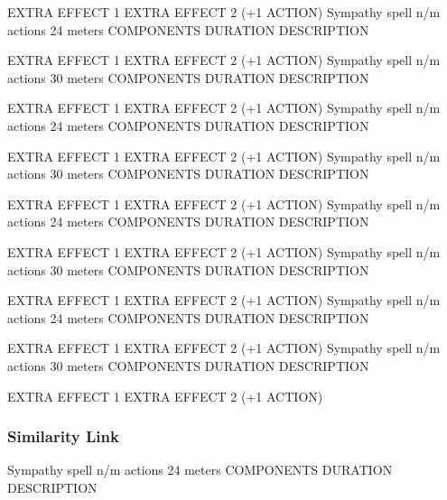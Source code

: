        EXTRA EFFECT 1
        EXTRA EFFECT 2 (+1 ACTION)
        {Sympathy spell}
        {n/m actions}
        {24 meters}
        {COMPONENTS}
        {DURATION}
        DESCRIPTION

        EXTRA EFFECT 1
        EXTRA EFFECT 2 (+1 ACTION)
        {Sympathy spell}
        {n/m actions}
        {30 meters}
        {COMPONENTS}
        {DURATION}
        DESCRIPTION

        EXTRA EFFECT 1
        EXTRA EFFECT 2 (+1 ACTION)
        {Sympathy spell}
        {n/m actions}
        {24 meters}
        {COMPONENTS}
        {DURATION}
        DESCRIPTION

        EXTRA EFFECT 1
        EXTRA EFFECT 2 (+1 ACTION)
        {Sympathy spell}
        {n/m actions}
        {30 meters}
        {COMPONENTS}
        {DURATION}
        DESCRIPTION

        EXTRA EFFECT 1
        EXTRA EFFECT 2 (+1 ACTION)
        {Sympathy spell}
        {n/m actions}
        {24 meters}
        {COMPONENTS}
        {DURATION}
        DESCRIPTION

        EXTRA EFFECT 1
        EXTRA EFFECT 2 (+1 ACTION)
        {Sympathy spell}
        {n/m actions}
        {30 meters}
        {COMPONENTS}
        {DURATION}
        DESCRIPTION

        EXTRA EFFECT 1
        EXTRA EFFECT 2 (+1 ACTION)
        {Sympathy spell}
        {n/m actions}
        {24 meters}
        {COMPONENTS}
        {DURATION}
        DESCRIPTION

        EXTRA EFFECT 1
        EXTRA EFFECT 2 (+1 ACTION)
        {Sympathy spell}
        {n/m actions}
        {30 meters}
        {COMPONENTS}
        {DURATION}
        DESCRIPTION

        EXTRA EFFECT 1
        EXTRA EFFECT 2 (+1 ACTION)
\subsubsection{Similarity Link}
        {Sympathy spell}
        {n/m actions}
        {24 meters}
        {COMPONENTS}
        {DURATION}
        DESCRIPTION

